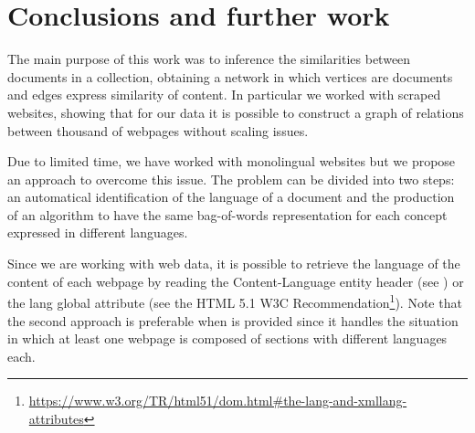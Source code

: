 \chapter{Conclusions and further work}
The main purpose of this work was to inference
the similarities between documents in a collection,
obtaining a network in which vertices are documents and
edges express similarity of content.
In particular we worked with scraped websites,
showing that for our data it is possible to construct
a graph of relations between thousand of webpages
without scaling issues.

Due to limited time, we have worked with monolingual
websites but we propose an approach to overcome this issue.
The problem can be divided into two steps:
an automatical identification of the language of a document and
the production of an algorithm to have the same bag-of-words
representation for each concept expressed in different languages.

Since we are working with web data, it is possible to retrieve the language
of the content of each webpage by reading the Content-Language entity header
(see \cite{rfc7231}) or the lang global attribute
(see the HTML 5.1 W3C Recommendation\footnote{\url{https://www.w3.org/TR/html51/dom.html\#the-lang-and-xmllang-attributes}}).
Note that the second approach is preferable when  is provided
since it handles the situation in which at least
one webpage is composed of sections with different languages each.

